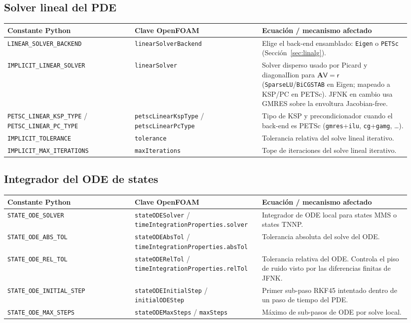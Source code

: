 \documentclass[11pt,a4paper]{article}
\newcommand{\code}[1]{\texttt{\small #1}}
\newcommand{\Aimp}{\mathbf{A}}
\begin{document}
\subsection{Solver lineal del PDE}
\begin{longtable}{@{}p{0.30\linewidth}p{0.30\linewidth}p{0.35\linewidth}@{}}
\toprule
Constante Python & Clave OpenFOAM & Ecuación / mecanismo afectado \\
\midrule \endhead
\code{LINEAR\_SOLVER\_BACKEND} & \code{linearSolverBackend} &
   Elige el back-end ensamblado: \code{Eigen} o \code{PETSc}
   (Sección~\ref{sec:linalg}). \\
\code{IMPLICIT\_LINEAR\_SOLVER} & \code{linearSolver} &
   Solver disperso usado por Picard y diagonalIion para
   $\Aimp\mathsf{V}=\mathsf{r}$ (\code{SparseLU}/\code{BiCGSTAB} en Eigen; mapeado a
   KSP/PC en PETSc). JFNK en cambio usa GMRES sobre la envoltura Jacobian-free. \\
\code{PETSC\_LINEAR\_KSP\_TYPE} / \code{PETSC\_LINEAR\_PC\_TYPE} &
   \code{petscLinearKspType} / \code{petscLinearPcType} &
   Tipo de KSP y precondicionador cuando el back-end es PETSc
   (\code{gmres}+\code{ilu}, \code{cg}+\code{gamg}, \dots). \\
\code{IMPLICIT\_TOLERANCE} & \code{tolerance} &
   Tolerancia relativa del solve lineal iterativo. \\
\code{IMPLICIT\_MAX\_ITERATIONS} & \code{maxIterations} &
   Tope de iteraciones del solve lineal iterativo. \\
\bottomrule
\end{longtable}

\subsection{Integrador del ODE de states}
\begin{longtable}{@{}p{0.30\linewidth}p{0.30\linewidth}p{0.35\linewidth}@{}}
\toprule
Constante Python & Clave OpenFOAM & Ecuación / mecanismo afectado \\
\midrule \endhead
\code{STATE\_ODE\_SOLVER} & \code{stateODESolver} /
   \code{timeIntegrationProperties.solver} &
   Integrador de ODE local para states MMS o states TNNP. \\
\code{STATE\_ODE\_ABS\_TOL} & \code{stateODEAbsTol} /
   \code{timeIntegrationProperties.absTol} &
   Tolerancia absoluta del solve del ODE. \\
\code{STATE\_ODE\_REL\_TOL} & \code{stateODERelTol} /
   \code{timeIntegrationProperties.relTol} &
   Tolerancia relativa del ODE. Controla el piso de ruido visto por las diferencias
   finitas de JFNK. \\
\code{STATE\_ODE\_INITIAL\_STEP} & \code{stateODEInitialStep} /
   \code{initialODEStep} &
   Primer sub-paso RKF45 intentado dentro de un paso de tiempo del PDE. \\
\code{STATE\_ODE\_MAX\_STEPS} & \code{stateODEMaxSteps} /
   \code{maxSteps} &
   Máximo de sub-pasos de ODE por solve local. \\
\bottomrule
\end{longtable}
\end{document}
